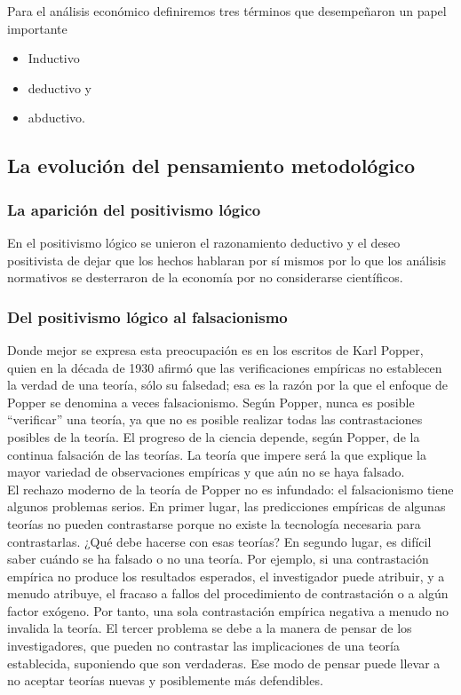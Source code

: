 \documentclass[10pt]{book}
\begin{document}
Para el análisis económico definiremos tres términos que desempeñaron un papel importante 

\begin{itemize}
    \item Inductivo
    \item deductivo y
    \item abductivo.
\end{itemize}


\subsection{La evolución del pensamiento metodológico}
\subsubsection{La aparición del positivismo lógico}
En el positivismo lógico se unieron el razonamiento deductivo y el deseo positivista de dejar que los hechos hablaran por sí mismos por lo que los análisis normativos se desterraron de la economía por no considerarse científicos.

\subsubsection{Del positivismo lógico al falsacionismo}
Donde mejor se expresa esta preocupación es en los escritos de Karl Popper, quien en la década de 1930 afirmó que las verificaciones empíricas no establecen la verdad de una teoría, sólo su falsedad; esa es la razón por la que el enfoque de Popper se denomina a veces falsacionismo. Según Popper, nunca es posible “verificar” una teoría, ya que no es posible realizar todas las contrastaciones posibles de la teoría. El progreso de la ciencia depende, según Popper, de la continua falsación de las teorías. La teoría que impere será la que explique la mayor variedad de observaciones empíricas y que aún no se haya falsado.\\

El rechazo moderno de la teoría de Popper no es infundado: el falsacionismo tiene algunos problemas serios. En primer lugar, las predicciones empíricas de algunas teorías no pueden contrastarse porque no existe la tecnología necesaria para contrastarlas. ¿Qué debe hacerse con esas teorías? En segundo lugar, es difícil saber cuándo se ha falsado o no una teoría. Por ejemplo, si una contrastación empírica no produce los resultados esperados, el investigador puede atribuir, y a menudo atribuye, el fracaso a fallos del procedimiento de contrastación o a algún factor exógeno. Por tanto, una sola contrastación empírica negativa a menudo no invalida la teoría. El tercer problema se debe a la manera de pensar de los investigadores, que pueden no contrastar las implicaciones de una teoría establecida, suponiendo que son verdaderas. Ese modo de pensar puede llevar a no aceptar teorías nuevas y posiblemente más defendibles.
\end{document}
